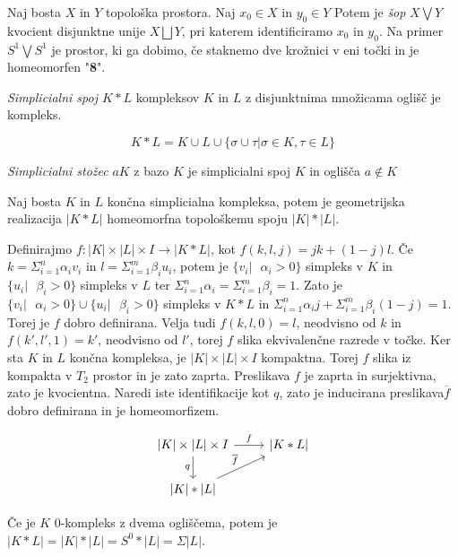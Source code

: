 \documentclass[mat1]{fmfdelo}
\begin{document}
Naj bosta $X$ in $Y$ topološka prostora. Naj $x_0\in X$ in $y_0\in Y$ Potem je 
\textit{šop} $X\bigvee Y$ kvocient disjunktne unije $X\bigsqcup Y$, pri
 katerem identificiramo $x_0$ in $y_0$. Na primer $S^1\bigvee S^1$ je prostor,
  ki ga dobimo, če staknemo dve krožnici v eni točki in je homeomorfen "\textbf{8}".


\textit{Simplicialni spoj $K\ast L$} kompleksov $K$ in $L$ z disjunktnima množicama oglišč je kompleks.

$$
K\ast L=K\cup L \cup \{\sigma \cup \tau| \sigma \in K, \tau \in L \}
$$

\textit{Simplicialni stožec} $aK$ z bazo $K$ je simplicialni spoj $K$ in oglišča $a\notin K$


\begin{trditev}
    Naj bosta $K$ in $L$ končna simplicialna kompleksa, potem je geometrijska realizacija $|K\ast L|$ homeomorfna topološkemu spoju $|K|\ast |L|$.
    \label{tr:spoj}
\end{trditev}

\begin{dokaz}
    Definirajmo $f:|K|\times |L|\times I\rightarrow |K\ast L|$, kot $f(k,l,j)=jk+(1-j)l$. Če $k=\Sigma_{i=1}^n \alpha_i v_i$ in $l=\Sigma_{i=1}^m \beta_i u_i$, potem je $\{v_i|\text{ $\alpha_i > 0$}\}$ simpleks v $K$ in $\{u_i|\text{ $\beta_i > 0$}\}$ simpleks v $L$ ter $\Sigma_{i=1}^n \alpha_i = \Sigma_{i=1}^m \beta_i=1$. Zato je $\{v_i|\text{ $\alpha_i > 0$}\}\cup \{u_i|\text{ $\beta_i > 0$}\}$ simpleks v $K\ast L$  in $\Sigma_{i=1}^n \alpha_i j + \Sigma_{i=1}^m \beta_i (1-j)=1$. Torej je $f$ dobro definirana. Velja tudi $f(k,l,0)=l$, neodvisno od $k$ in $f(k',l',1)=k'$, neodvisno od $l'$, torej $f$ slika ekvivalenčne razrede v točke. Ker sta $K$ in $L$ končna kompleksa, je $|K|\times |L|\times I$ kompaktna. Torej $f$ slika iz kompakta v $T_2$ prostor in je zato zaprta. Preslikava $f$ je zaprta in surjektivna, zato je kvocientna. Naredi iste identifikacije kot $q$, zato je inducirana preslikava$\overline{f}$ dobro definirana in je homeomorfizem.
    
\[\begin{tikzcd}
    {|K|\times |L|\times I }\arrow{r}{f} \arrow[swap]{d}{q} & {|K\ast L|} \\
    {|K|\ast |L|} \arrow{ru}{\overline{f}}
   \end{tikzcd}
    \]


\end{dokaz}

Če je $K$ 0-kompleks z dvema ogliščema, potem je $|K\ast L|=|K|\ast |L|=S^0\ast |L| = \Sigma |L|$.
\end{document}
